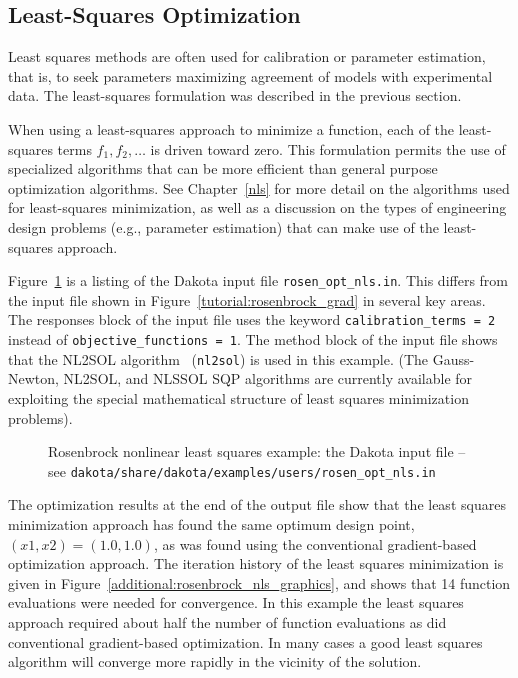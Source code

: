 \subsection{Least-Squares Optimization}\label{additional:rosenbrock:examples:nonlinear}

Least squares methods are often used for calibration or parameter
estimation, that is, to seek parameters maximizing agreement of models
with experimental data. The least-squares formulation was described in
the previous section.

When using a least-squares approach to minimize a function, each of the
least-squares terms $f_1, f_2,\ldots$ is driven toward zero. This
formulation permits the use of specialized algorithms that can be more
efficient than general purpose optimization algorithms. See
Chapter~\ref{nls} for more detail on the algorithms used for least-squares
minimization, as well as a discussion on the types of
engineering design problems (e.g., parameter estimation) that can make
use of the least-squares approach.

Figure~\ref{additional:rosenbrock_nls} is a listing of the Dakota input
file \texttt{rosen\_opt\_nls.in}. This differs from the input
file shown in Figure~\ref{tutorial:rosenbrock_grad} in several key
areas. The responses block of the input file uses the keyword
\texttt{calibration\_terms = 2} instead of
\texttt{objective\_functions = 1}.
The method block of the input file shows that the NL2SOL
algorithm~\cite{Den81} (\texttt{nl2sol}) is used in this example. (The
Gauss-Newton, NL2SOL, and NLSSOL SQP algorithms are currently
available for exploiting the special mathematical structure of least
squares minimization problems).

\begin{figure}[ht!]
  \centering
  \begin{bigbox}
    \begin{small}
    \end{small}
  \end{bigbox}
  \caption{Rosenbrock nonlinear least squares example: the Dakota input file --
see \texttt{dakota/share/dakota/examples/users/rosen\_opt\_nls.in} }
  \label{additional:rosenbrock_nls}
\end{figure}

The optimization results at the end of the output file show that the least
squares minimization approach has found the same optimum design point,
$(x1,x2) = (1.0,1.0)$, as was found using the conventional
gradient-based optimization approach. The iteration history of the
least squares minimization is given in
Figure~\ref{additional:rosenbrock_nls_graphics}, and shows that 14
function evaluations were needed for convergence. In this example the
least squares approach required about half the number of function
evaluations as did conventional gradient-based optimization.
In many cases a good least squares algorithm will converge more rapidly
in the vicinity of the solution.

